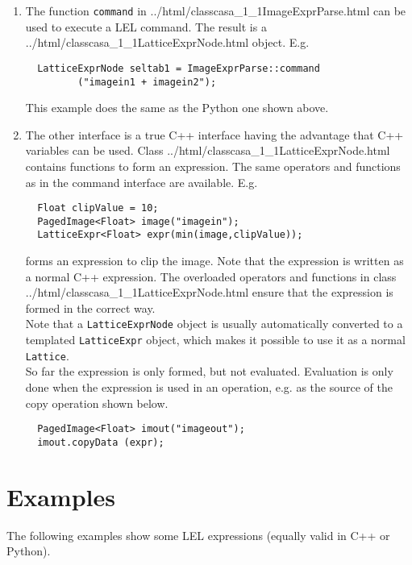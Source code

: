 \begin{enumerate}
  \item
    The function \texttt{command} in
    {../html/classcasa_1_1ImageExprParse.html}
    can be used to execute a LEL command. The result is a
    {../html/classcasa_1_1LatticeExprNode.html}
    object. E.g.
\begin{verbatim}
  LatticeExprNode seltab1 = ImageExprParse::command
         ("imagein1 + imagein2");
\end{verbatim}
    This example does the same as the Python one shown above.

  \item
    The other interface is a true C++ interface having the
    advantage that C++ variables can be used. Class
    {../html/classcasa_1_1LatticeExprNode.html}
    contains functions to form an expression. The same operators
    and functions as in the command interface are available.
    E.g.
\begin{verbatim}
  Float clipValue = 10;
  PagedImage<Float> image("imagein");
  LatticeExpr<Float> expr(min(image,clipValue));
\end{verbatim}
    forms an expression to clip the image. Note that the expression is
    written as a normal C++ expression. The overloaded operators and
    functions in class 
    {../html/classcasa_1_1LatticeExprNode.html}
    ensure that the expression is formed in the correct way.
    \\ Note that a \texttt{LatticeExprNode} object is usually
    automatically converted to a templated \texttt{LatticeExpr} object,
    which makes it possible to use it as a normal \texttt{Lattice}.
    \\So far the expression is only formed, but not evaluated.
    Evaluation is only done when the expression is used in an
    operation, e.g. as the source of the copy operation shown below.
\begin{verbatim}
  PagedImage<Float> imout("imageout");
  imout.copyData (expr);
\end{verbatim}

  \end{enumerate}


\section{\label{LEL:EXAMPLES}{Examples}}
The following examples show some LEL expressions (equally valid 
in C++ or Python).

